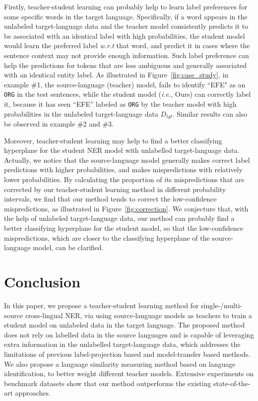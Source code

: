 \documentclass[11pt,a4paper]{article}
\newcommand\ie{\textit{i.e.}}
\newcommand\wrt{\textit{w.r.t}}
\begin{document}
	Firstly, teacher-student learning can probably help to learn label preferences for some specific words in the target language. Specifically, if a word appears in the unlabeled target-language data and the teacher model consistently predicts it to be associated with an identical label with high probabilities, the student model would learn the preferred label \wrt{} that word, and predict it in cases where the sentence context may not provide enough information. Such label preference can help the predictions for tokens that are less ambiguous and generally associated with an identical entity label. As illustrated in Figure~\ref{fig:case_study}, in example \#1, the source-language (teacher) model, fails to identify ``EFE" as an \texttt{ORG} in the test sentences, while the student model (\ie, Ours) can correctly label it, because it has seen ``EFE'' labeled as \texttt{ORG} by the teacher model with high probabilities in the unlabeled target-language data $D_{tgt}$. Similar results can also be observed in example \#2 and \#3.


	Moreover, teacher-student learning may help to find a better classifying hyperplane for the student NER model with unlabelled target-language data. Actually, we notice that the source-language model generally makes correct label predictions with higher probabilities, and makes mispredictions with relatively lower probabilities. By calculating the proportion of its mispredictions that are corrected by our teacher-student learning method in different probability intervals, we find that our method tends to correct the low-confidence mispredictions, as illustrated in Figure~\ref{fig:correction}. We conjecture that, with the help of unlabeled target-language data, our method can probably find a  better classifying hyperplane for the student model, so that the low-confidence mispredictions, which are closer to the classifying hyperplane of the source-language model, can be clarified. 

\section{Conclusion}
	In this paper, we propose a teacher-student learning method for single-/multi-source cross-lingual NER, via using source-language models as teachers to train a student model on unlabeled data in the target language. The proposed method does not rely on labelled data in the source languages and is capable of leveraging extra information in the unlabelled target-language data, which addresses the limitations of previous label-projection based and model-transfer based methods. We also propose a language similarity measuring method based on language identification, to better weight different teacher models. Extensive experiments on benchmark datasets show that our method outperforms the existing state-of-the-art approaches. 



	
	
\end{document}

